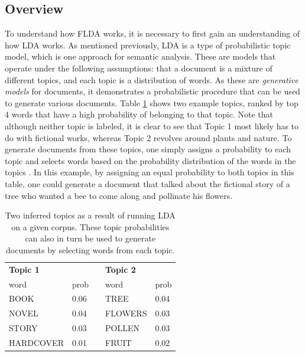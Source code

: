 \documentclass[a4paper]{article}
\begin{document}
\subsection{Overview}
To understand how FLDA works, it is necessary to first gain an understanding of how LDA works. As mentioned previously, LDA is a type of probabilistic topic model, which is one approach for semantic analysis. These are models that operate under the following assumptions: that a document is a mixture of different topics, and each topic is a distribution of words. As these are \textit{generative models} for documents, it demonstrates a probabilistic procedure that can be used to generate various documents. Table \ref{tab:ldatopics} shows two example topics, ranked by top 4 words that have a high probability of belonging to that topic. Note that although neither topic is labeled, it is clear to see that Topic 1 most likely has to do with fictional works, whereas Topic 2 revolves around plants and nature. To generate documents from these topics, one simply assigns a probability to each topic and selects words based on the probability distribution of the words in the topics \cite{lda}. In this example, by assigning an equal probability to both topics in this table, one could generate a document that talked about the fictional story of a tree who wanted a bee to come along and pollinate his flowers.

\begin{table}[h]
  \centering %
  \begin{tabular}{ |l|l|l|l|l| }
    \cline{0-1}
    \cline{4-5}
    \multicolumn{2}{|l|}{\textbf{Topic 1}} & & \multicolumn{2}{|l|}{\textbf{Topic 2}} \\
    \cline{0-1}
    \cline{4-5}
    word & prob & & word & prob \\
    \cline{0-1}
    \cline{4-5}
    BOOK & 0.06 & & TREE & 0.04 \\
    NOVEL & 0.04 & & FLOWERS & 0.03 \\
    STORY & 0.03 & & POLLEN & 0.03 \\
    HARDCOVER & 0.01 & & FRUIT & 0.02 \\
    \cline{0-1}
    \cline{4-5}
  \end{tabular}
  \caption{Two inferred topics as a result of running LDA on a given corpus. These topic probabilities can also in turn be used to generate documents by selecting words from each topic.}
  \label{tab:ldatopics}
\end{table}
\end{document}
